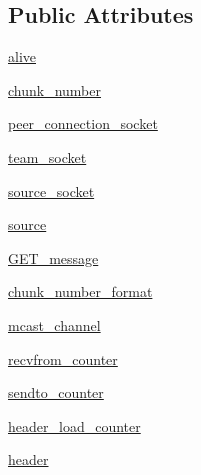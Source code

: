 \subsection*{Public Attributes}
\begin{DoxyCompactItemize}
\item 
\hyperlink{classsrc_1_1core_1_1splitter__ims_1_1Splitter__IMS_aa448560064cfec77b4c8b4ff3fb54577}{alive}
\item 
\hyperlink{classsrc_1_1core_1_1splitter__ims_1_1Splitter__IMS_a115d83ea6b9e356af5bfa6e0bf835ffa}{chunk\+\_\+number}
\item 
\hyperlink{classsrc_1_1core_1_1splitter__ims_1_1Splitter__IMS_ab81b7be50b45d060623ed628b06d38ad}{peer\+\_\+connection\+\_\+socket}
\item 
\hyperlink{classsrc_1_1core_1_1splitter__ims_1_1Splitter__IMS_ae1bfe8aed522f33b9786764fbfa3e502}{team\+\_\+socket}
\item 
\hyperlink{classsrc_1_1core_1_1splitter__ims_1_1Splitter__IMS_a16a478e7797e4ffb52da23251feba765}{source\+\_\+socket}
\item 
\hyperlink{classsrc_1_1core_1_1splitter__ims_1_1Splitter__IMS_a28b15348621ccb3e40c817d4c277206f}{source}
\item 
\hyperlink{classsrc_1_1core_1_1splitter__ims_1_1Splitter__IMS_ab076d4ffb0cfd1de97b6a17f82338afe}{G\+E\+T\+\_\+message}
\item 
\hyperlink{classsrc_1_1core_1_1splitter__ims_1_1Splitter__IMS_a7b223e6a247f692a871938f399ddfb15}{chunk\+\_\+number\+\_\+format}
\item 
\hyperlink{classsrc_1_1core_1_1splitter__ims_1_1Splitter__IMS_a7545a9e80cbd9af2b9ddf93a88cfb582}{mcast\+\_\+channel}
\item 
\hyperlink{classsrc_1_1core_1_1splitter__ims_1_1Splitter__IMS_abdb7c65fad4ef312c73fdc8d5f750c56}{recvfrom\+\_\+counter}
\item 
\hyperlink{classsrc_1_1core_1_1splitter__ims_1_1Splitter__IMS_a1dedcb0a33abcdaf1bb2fd208bf27e96}{sendto\+\_\+counter}
\item 
\hyperlink{classsrc_1_1core_1_1splitter__ims_1_1Splitter__IMS_aef2c2c44e02aaf4a176e25bd256a775e}{header\+\_\+load\+\_\+counter}
\item 
\hyperlink{classsrc_1_1core_1_1splitter__ims_1_1Splitter__IMS_a92627c25b3466182980fcbdd243bac3d}{header}
\end{DoxyCompactItemize}
